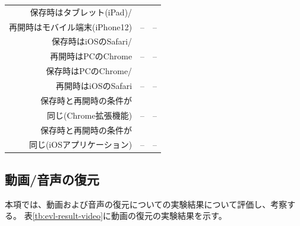 \begin{table}[htbp]
\begin{center}
\begin{tabular}{rrr}
      保存時はタブレット(iPad)/\\
      再開時はモバイル端末(iPhone12) & -- & -- \\ \hline
      保存時はiOSのSafari/\\
      再開時はPCのChrome & -- & -- \\ \hline
      保存時はPCのChrome/\\
      再開時はiOSのSafari & -- & -- \\ \hline
      保存時と再開時の条件が\\
      同じ(Chrome拡張機能) & -- & -- \\ \hline
      保存時と再開時の条件が\\
      同じ(iOSアプリケーション) & -- & -- \\ \hline
    \end{tabular}
  \end{center}
\end{table}

\subsection{動画/音声の復元}
本項では、動画および音声の復元についての実験結果について評価し、考察する。
表\ref{tb:evl-result-video}に動画の復元の実験結果を示す。

